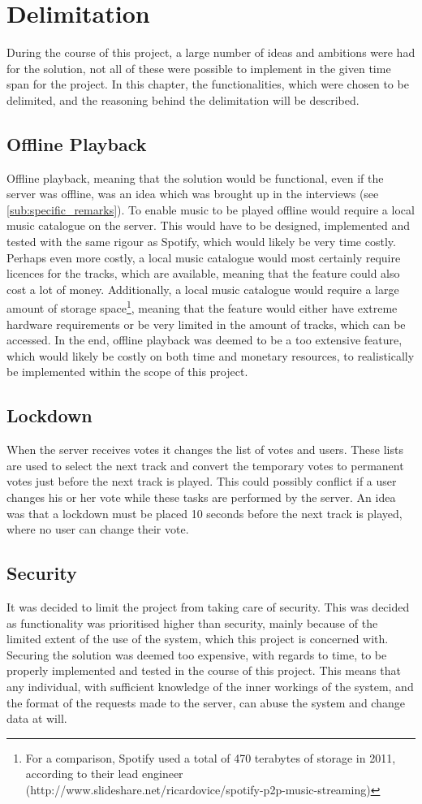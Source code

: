 \chapter{Delimitation}
During the course of this project, a large number of ideas and ambitions were had for the solution, not all of these were possible to implement in the given time span for the project. In this chapter, the functionalities, which were chosen to be delimited, and the reasoning behind the delimitation will be described.

\section{Offline Playback}
Offline playback, meaning that the solution would be functional, even if the server was offline, was an idea which was brought up in the interviews (see \cref{sub:specific_remarks}).
To enable music to be played offline would require a local music catalogue on the server. This would have to be designed, implemented and tested with the same rigour as Spotify, which would likely be very time costly.
Perhaps even more costly, a local music catalogue would most certainly require licences for the tracks, which are available, meaning that the feature could also cost a lot of money. Additionally, a local music catalogue would require a large amount of storage space\footnote{For a comparison, Spotify used a total of 470 terabytes of storage in 2011, according to their lead engineer (http://www.slideshare.net/ricardovice/spotify-p2p-music-streaming)}, meaning that the feature would either have extreme hardware requirements or be very limited in the amount of tracks, which can be accessed.
In the end, offline playback was deemed to be a too extensive feature, which would likely be costly on both time and monetary resources, to realistically be implemented within the scope of this project.

\section{Lockdown}
When the server receives votes it changes the list of votes and
users. These lists are used to select the next track and convert the
temporary votes to permanent votes just before the next track is
played. This could possibly conflict if a user changes his or her vote
while these tasks are performed by the server. An idea was that a lockdown must be placed 10 seconds before the next track is played, where no user can change their vote.

\section{Security}
It was decided to limit the project from taking care of security. This was decided as functionality was prioritised higher than security, mainly because of the limited extent of the use of the system, which this project is concerned with. Securing the solution was deemed too expensive, with regards to time, to be properly implemented and tested in the course of this project.
This means that any individual, with sufficient knowledge of the inner workings of the system, and the format of the requests made to the server, can abuse the system and change data at will.
